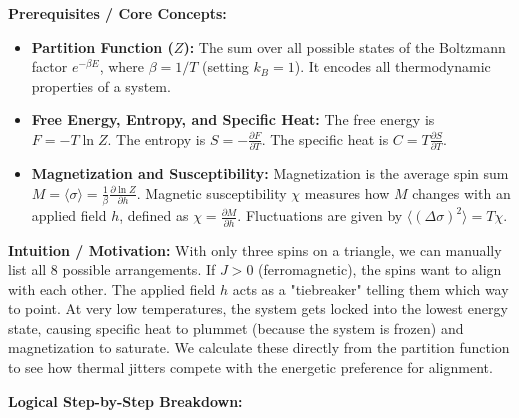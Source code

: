 \begin{solution}
\textbf{Prerequisites / Core Concepts:}
\begin{itemize}
    \item \textbf{Partition Function ($Z$):} The sum over all possible states of the Boltzmann factor $e^{-\beta E}$, where $\beta = 1/T$ (setting $k_B=1$). It encodes all thermodynamic properties of a system.
    \item \textbf{Free Energy, Entropy, and Specific Heat:} The free energy is $F = -T \ln Z$. The entropy is $S = -\frac{\partial F}{\partial T}$. The specific heat is $C = T \frac{\partial S}{\partial T}$.
    \item \textbf{Magnetization and Susceptibility:} Magnetization is the average spin sum $M = \langle \sigma \rangle = \frac{1}{\beta} \frac{\partial \ln Z}{\partial h}$. Magnetic susceptibility $\chi$ measures how $M$ changes with an applied field $h$, defined as $\chi = \frac{\partial M}{\partial h}$. Fluctuations are given by $\langle (\Delta \sigma)^2 \rangle = T \chi$.
\end{itemize}

\textbf{Intuition / Motivation:}
With only three spins on a triangle, we can manually list all 8 possible arrangements. If $J > 0$ (ferromagnetic), the spins want to align with each other. The applied field $h$ acts as a "tiebreaker" telling them which way to point. At very low temperatures, the system gets locked into the lowest energy state, causing specific heat to plummet (because the system is frozen) and magnetization to saturate. We calculate these directly from the partition function to see how thermal jitters compete with the energetic preference for alignment.

\textbf{Logical Step-by-Step Breakdown:}


\end{solution}
